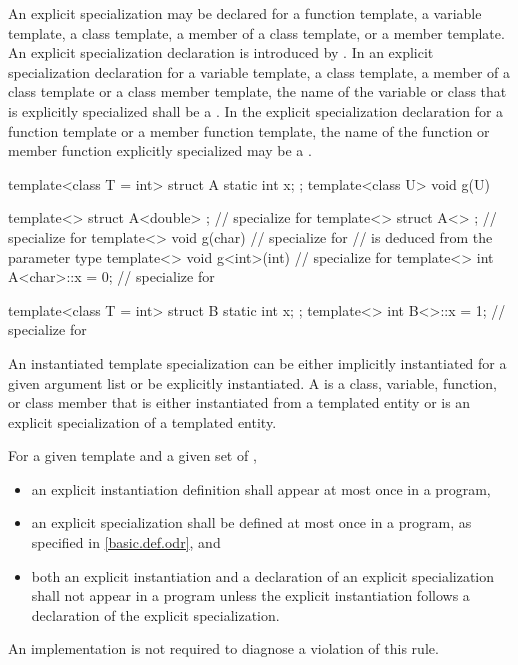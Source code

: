 \pnum
An explicit specialization may be declared for a function template,
a variable template, a class template, a member of a class template, or
a member template.
An explicit specialization declaration is introduced by
.
In an explicit specialization declaration for
a variable template, a class template,
a member of a class template or a class member template,
the name of the variable or class that is explicitly specialized shall be a
.
In the explicit specialization declaration for a function template or
a member function template,
the name of the function or member function explicitly specialized may be a
.
\begin{example}
\begin{codeblock}
template<class T = int> struct A {
  static int x;
};
template<class U> void g(U) { }

template<> struct A<double> { };        // specialize for 
template<> struct A<> { };              // specialize for 
template<> void g(char) { }             // specialize for 
                                        //  is deduced from the parameter type
template<> void g<int>(int) { }         // specialize for 
template<> int A<char>::x = 0;          // specialize for 

template<class T = int> struct B {
  static int x;
};
template<> int B<>::x = 1;              // specialize for 
\end{codeblock}
\end{example}

\pnum
An instantiated template specialization can be either implicitly
instantiated for a given argument list or be explicitly
instantiated.
A  is a class, variable, function, or class member that is either
instantiated from a templated entity or is an
explicit specialization of a templated entity.

\pnum
For a given template and a given set of
,
\begin{itemize}
\item
an explicit instantiation definition shall appear at most once in a program,
\item
an explicit specialization shall be defined at most once
in a program, as specified in \ref{basic.def.odr}, and
\item
both an explicit instantiation and a declaration of an
explicit specialization shall not appear in a program unless
the explicit instantiation follows a declaration of the explicit
specialization.
\end{itemize}
An implementation is not required to diagnose a violation of this rule.

